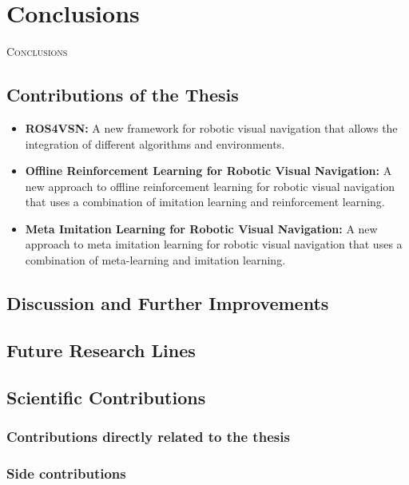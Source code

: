 \chapter{Conclusions}\label{ch:conclusions}

\lettrine{C}{onclusions}


\section{Contributions of the Thesis}\label{sec:contributions-of-the-thesis}
\begin{itemize}
    \item \textbf{ROS4VSN:} A new framework for robotic visual navigation that allows the integration of different algorithms and environments.
    \item \textbf{Offline Reinforcement Learning for Robotic Visual Navigation:} A new approach to offline reinforcement learning for robotic visual navigation that uses a combination of imitation learning and reinforcement learning.
    \item \textbf{Meta Imitation Learning for Robotic Visual Navigation:} A new approach to meta imitation learning for robotic visual navigation that uses a combination of meta-learning and imitation learning.
\end{itemize}


\section{Discussion and Further Improvements}\label{sec:discussion-and-further-improvements}


\section{Future Research Lines}\label{sec:future-work}


\section{Scientific Contributions}\label{sec:final-remarks}

\subsection{Contributions directly related to the thesis}\label{sec:contributions-directly-related-to-the-thesis}

\subsection{Side contributions}\label{sec:side-contributions}